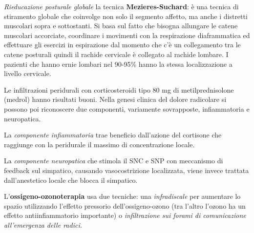 \documentclass[]{article}
\begin{document}
\emph{\emph{Rieducazione posturale globale}} la tecnica
\textbf{Mezieres-Suchard}: è una tecnica di stiramento globale che
coinvolge non solo il segmento affetto, ma anche i distretti muscolari
sopra e sottostanti. Si basa sul fatto che bisogna allungare le catene
muscolari accorciate, coordinare i movimenti con la respirazione
diaframmatica ed effettuare gli esercizi in espirazione dal momento che
c'è un collegamento tra le catene posturali quindi il rachide cervicale
è collegato al rachide lombare. I pazienti che hanno ernie lombari nel
90-95\% hanno la stessa localizzazione a livello cervicale.

Le infiltrazioni peridurali con corticosteroidi tipo 80 mg di
metilprednisolone (medrol) hanno risultati buoni. Nella genesi clinica
del dolore radicolare si possono poi riconoscere due componenti,
variamente sovrapposte, infiammatoria e neuropatica.

La \emph{componente infiammatoria} trae beneficio dall'azione del
cortisone che raggiunge con la peridurale il massimo di concentrazione
locale.

La \emph{componente neuropatica} che stimola il SNC e SNP con meccanismo
di feedback sul simpatico, causando vasocostrizione localizzata, viene
invece trattata dall'anestetico locale che blocca il simpatico.

L'\textbf{ossigeno-ozonoterapia} usa due tecniche: una
\emph{infradiscale} per aumentare lo spazio utilizzando l'effetto
pressorio dell'ossigeno-ozono (tra l'altro l'ozono ha un effetto
antiinfiammatorio importante) o \emph{infiltrazione sui forami di
comunicazione all'emergenza delle radici.}
\end{document}
